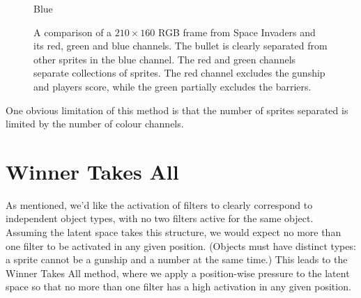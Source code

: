 \begin{figure}[h!]
\begin{multicols}{4}
    \caption{Blue}
\end{multicols}
\caption{A comparison of a $210 \times 160$ RGB frame from Space Invaders and its red, green and blue channels. The bullet is clearly separated from other sprites in the blue channel. The red and green channels separate collections of sprites. The red channel excludes the gunship and players score, while the green partially excludes the barriers.}
\label{fig:separating_colour_spaces}
\end{figure}


One obvious limitation of this method is that the number of sprites separated is limited by the number of colour channels.



%
%
%
%
%
\section{Winner Takes All}
As mentioned, we'd like the activation of filters to clearly correspond to independent object types, with no two filters active for the same object. Assuming the latent space takes this structure, we would expect no more than one filter to be activated in any given position. (Objects must have distinct types: a sprite cannot be a gunship and a number at the same time.) This leads to the Winner Takes All method, where we apply a position-wise pressure to the latent space so that no more than one filter has a high activation in any given position.

